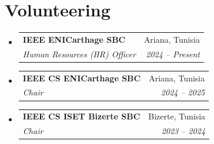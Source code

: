 \documentclass[a4paper,9.5pt]{article}
\makeatletter
\newcommand{\resumeSubheading}[4]{
  \vspace{-1pt}\item
    \begin{tabular*}{0.97\textwidth}{l@{\extracolsep{\fill}}r}
      \textbf{#1} & \small #2 \\
      \textit{\small #3} & \textit{\small #4} \\
    \end{tabular*}\vspace{-5pt}
}
\newcommand{\resumeSubHeadingListStart}{\begin{itemize}[leftmargin=*]}
\newcommand{\resumeSubHeadingListEnd}{\end{itemize}}
\makeatother
\begin{document}
\vspace{-3pt}
\section{Volunteering}
\resumeSubHeadingListStart
  \resumeSubheading{IEEE ENICarthage SBC}{Ariana, Tunisia}
    {Human Resources (HR) Officer}{2024 -- Present}
  \resumeSubheading{IEEE CS ENICarthage SBC}{Ariana, Tunisia}
    {Chair}{2024 -- 2025}
  \resumeSubheading{IEEE CS ISET Bizerte SBC}{Bizerte, Tunisia}
    {Chair}{2023 -- 2024}
\resumeSubHeadingListEnd
\end{document}

